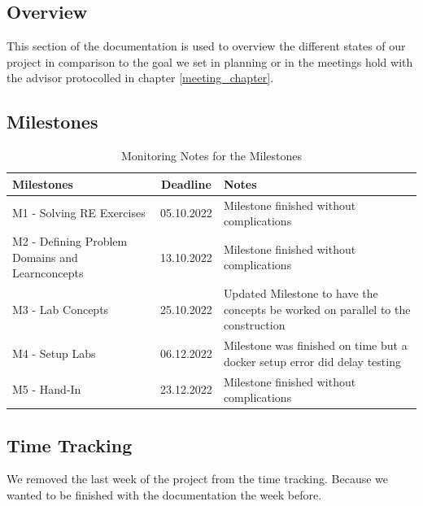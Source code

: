 \subsection{Overview}
This section of the documentation is used to overview the different states of our project in comparison to the goal we set in planning or in the meetings hold with the advisor protocolled in chapter \ref*{meeting_chapter}.

\subsection{Milestones}

\begin{table}[H]
    \centering
    \begin{tabular}[]{|| p{5cm} | c | p{6.2cm} ||}
        \hline
        Milestones & Deadline & Notes \\
        \hline \hline
        M1 - Solving RE Exercises & 05.10.2022 & Milestone finished without complications \\
        \hline
        M2 - Defining Problem Domains and Learnconcepts& 13.10.2022 & Milestone finished without complications \\
        \hline
        M3 - Lab Concepts & 25.10.2022 & Updated Milestone to have the concepts be worked on parallel to the construction \\
        \hline
        M4 - Setup Labs & 06.12.2022 & Milestone was finished on time but a docker setup error did delay testing\\
        \hline
        M5 - Hand-In & 23.12.2022 & Milestone finished without complications \\
        \hline
    \end{tabular}
    \caption{Monitoring Notes for the Milestones}
    \label{milestones_monitoring_table}
\end{table}

\subsection{Time Tracking}

We removed the last week of the project from the time tracking. Because we wanted to be finished with the documentation the week before.


